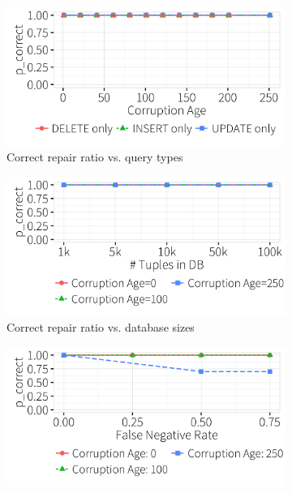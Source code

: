 \begin{description}[leftmargin=0mm, topsep=0mm, itemsep=0mm, parsep=1mm]
   \begin{figure}[t]
  \centering
  \begin{subfigure} [t]{.3\textwidth}
    \includegraphics[width = .99\columnwidth]{figures/indelup_acc_idx}
    \vspace*{-.25in}
    \caption{Correct repair ratio vs. query types}
    \label{f:querytyperatio} 
    \end{subfigure}
    \begin{subfigure} [t]{.3\textwidth}
    \includegraphics[width = .99\columnwidth]{figures/dbsize_acc_idx}
    \vspace*{-.25in}
    \caption{Correct repair ratio vs. database sizes}
    \label{f:dbsizeratio} 
    \end{subfigure}
    \begin{subfigure} [t]{.3\textwidth}
    \includegraphics[width = .99\columnwidth]{figures/noise_fn_acc_idx}

\end{subfigure}
\end{figure}
\end{description}
